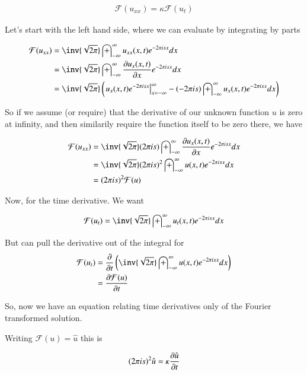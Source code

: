 \documentclass{article}
\newcommand{\FF}[0]{\mathcal{F}}
\newcommand{\IIinf}[0]{ \int_{-\infty}^\infty }
\begin{document}
\begin{align*}
\FF(u_{xx}) = \kappa \FF(u_t)
\end{align*}

Let's start with the left hand side, where we can evaluate by integrating by parts

\begin{align*}
\FF(u_{xx}) 
&= \inv{\sqrt{2\pi}} \IIinf u_{xx}(x, t) e^{- 2 \pi i s x } dx \\
&= \inv{\sqrt{2\pi}} \IIinf \PD{x}{u_x(x, t)} e^{- 2 \pi i s x } dx \\
&= \inv{\sqrt{2\pi}} 
\left(
{\left. u_x(x, t) e^{- 2 \pi i s x } \right\vert}_{x= -\infty}^\infty
-( - 2 \pi i s ) \IIinf u_x(x, t) e^{- 2 \pi i s x } dx 
\right) \\
\end{align*}

So if we assume (or require) that the derivative of our unknown function $u$ is zero at infinity, and then similarily
require the function itself to be zero there, we have

\begin{align*}
\FF(u_{xx}) 
&= \inv{\sqrt{2\pi}} ( 2 \pi i s ) \IIinf \PD{x}{u_x(x, t)} e^{- 2 \pi i s x } dx  \\
&= \inv{\sqrt{2\pi}} ( 2 \pi i s )^2 \IIinf u(x, t) e^{- 2 \pi i s x } dx  \\
&= ( 2 \pi i s )^2 \FF(u)
\end{align*}

Now, for the time derivative.  We want

\begin{align*}
\FF(u_t) &= \inv{\sqrt{2\pi}} \IIinf u_t(x, t) e^{- 2 \pi i s x } dx \\
\end{align*}

But can pull the derivative out of the integral for
\begin{align*}
\FF(u_t)
&= \PD{t}{} \left(\inv{\sqrt{2\pi}} \IIinf u(x, t) e^{- 2 \pi i s x } dx \right) \\
&= \PD{t}{\FF(u)} 
\end{align*}

So, now we have an equation relating time derivatives only of the Fourier transformed solution.

Writing $\FF(u) = \hat{u}$ this is

\begin{align}\label{eqn:toSolveFreq}
( 2 \pi i s )^2 \hat{u} = \kappa \PD{t}{\hat{u}}
\end{align}
\end{document}
